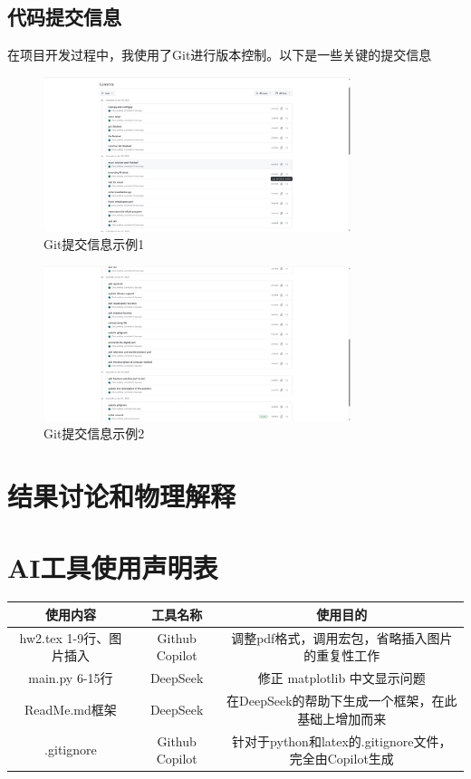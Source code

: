 \documentclass[UTF8]{ctexart}
\begin{document}
\subsection{代码提交信息}
在项目开发过程中，我使用了Git进行版本控制。以下是一些关键的提交信息
\begin{figure}[H]
    \centering
    \includegraphics[width=0.8\textwidth]{c1.png}
    \caption{Git提交信息示例1}
    \label{fig:git_commit_info1}
\end{figure}
\begin{figure}
    \centering
    \includegraphics[width=0.8\textwidth]{c2.png}
    \caption{Git提交信息示例2}
    \label{fig:git_commit_info2}
\end{figure}


\newpage
\section{结果讨论和物理解释}



\newpage
\appendix
\section*{AI工具使用声明表}
\begin{table}[H]
    \centering
    \begin{tabular}{c|c|c}
        \hline
        使用内容 & 工具名称 & 使用目的 \\ \hline
        hw2.tex 1-9行、图片插入 & Github Copilot & 调整pdf格式，调用宏包，省略插入图片的重复性工作 \\ 
        main.py 6-15行 & DeepSeek & 修正 matplotlib 中文显示问题 \\ 
        ReadMe.md框架 & DeepSeek & 在DeepSeek的帮助下生成一个框架，在此基础上增加而来 \\
        .gitignore & Github Copilot & 针对于python和latex的.gitignore文件，完全由Copilot生成  
    \end{tabular}
    \label{tab:AI_tools}
\end{table}


\newpage
\section*{}
\end{document}
